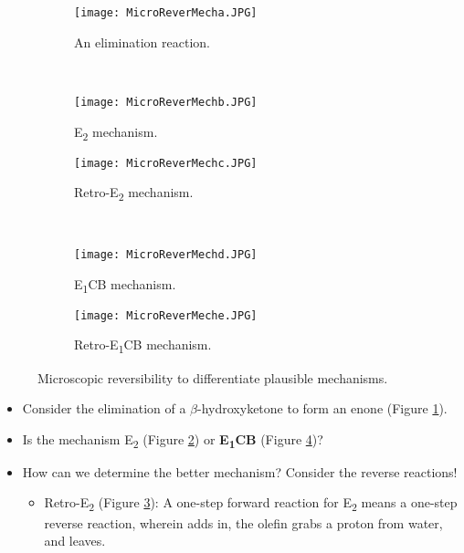 \documentclass[../notes.tex]{subfiles}
\begin{document}
\begin{itemize}
\begin{figure}[h!]
\begin{subfigure}[b]{\linewidth}
            \texttt{[image: MicroReverMecha.JPG]}
            \caption{An elimination reaction.}
            \label{fig:MicroReverMecha}
        \end{subfigure}\\[2em]
        \begin{subfigure}[b]{0.49\linewidth}
            \centering
            \texttt{[image: MicroReverMechb.JPG]}
            \caption{E\textsubscript{2} mechanism.}
            \label{fig:MicroReverMechb}
        \end{subfigure}
        \begin{subfigure}[b]{0.49\linewidth}
            \centering
            \texttt{[image: MicroReverMechc.JPG]}
            \caption{Retro-E\textsubscript{2} mechanism.}
            \label{fig:MicroReverMechc}
        \end{subfigure}\\[2em]
        \begin{subfigure}[b]{0.49\linewidth}
            \centering
            \texttt{[image: MicroReverMechd.JPG]}
            \caption{E\textsubscript{1}CB mechanism.}
            \label{fig:MicroReverMechd}
        \end{subfigure}
        \begin{subfigure}[b]{0.49\linewidth}
            \centering
            \texttt{[image: MicroReverMeche.JPG]}
            \caption{Retro-E\textsubscript{1}CB mechanism.}
            \label{fig:MicroReverMeche}
        \end{subfigure}
        \caption{Microscopic reversibility to differentiate plausible mechanisms.}
        \label{fig:MicroReverMech}
    \end{figure}
    \begin{itemize}
        \item Consider the elimination of a $\beta$-hydroxyketone to form an enone (Figure \ref{fig:MicroReverMecha}).
        \item Is the mechanism E\textsubscript{2} (Figure \ref{fig:MicroReverMechb}) or \textbf{E\textsubscript{1}CB} (Figure \ref{fig:MicroReverMechd})?
        \item How can we determine the better mechanism? Consider the reverse reactions!
        \begin{itemize}
            \item Retro-E\textsubscript{2} (Figure \ref{fig:MicroReverMechc}): A one-step forward reaction for E\textsubscript{2} means a one-step reverse reaction, wherein  adds in, the olefin grabs a proton from water, and  leaves.

\end{itemize}
\end{itemize}
\end{itemize}
\end{document}
